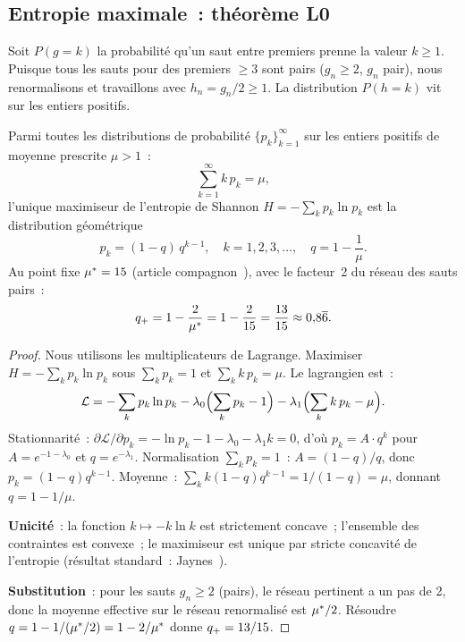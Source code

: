 \documentclass[12pt,a4paper]{article}
\begin{document}
\subsection{Entropie maximale~: théorème L0}
\label{sec:L0}

\begin{definition}
Soit $P(g = k)$ la probabilité qu'un saut entre premiers prenne la
valeur $k \geq 1$. Puisque tous les sauts pour des premiers $\geq 3$
sont pairs ($g_n \geq 2$, $g_n$ pair), nous renormalisons et
travaillons avec $h_n = g_n/2 \geq 1$. La distribution $P(h = k)$ vit
sur les entiers positifs.
\end{definition}

\mTHM
\begin{theoreme}
\label{thm:L0}
Parmi toutes les distributions de probabilité $\{p_k\}_{k=1}^\infty$
sur les entiers positifs de moyenne prescrite $\mu > 1$~:
\[
  \sum_{k=1}^\infty k\, p_k = \mu,
\]
l'unique maximiseur de l'entropie de Shannon
$H = -\sum_k p_k \ln p_k$ est la distribution géométrique
\begin{equation}
  p_k = (1-q)\, q^{k-1}, \quad k = 1, 2, 3, \ldots,
  \quad q = 1 - \frac{1}{\mu}.
  \label{eq:geometric}
\end{equation}
Au point fixe ${\mu^{*}} = 15$ (article compagnon~\cite{companion_M3}),
avec le facteur~2 du réseau des sauts pairs~:
\begin{equation}
  q_{+} = 1 - \frac{2}{{\mu^{*}}} = 1 - \frac{2}{15} = \frac{13}{15}
         \approx 0{,}8\overline{6}.
  \label{eq:qstat}
\end{equation}

\begin{proof}
Nous utilisons les multiplicateurs de Lagrange. Maximiser
$H = -\sum_k p_k \ln p_k$ sous $\sum_k p_k = 1$ et
$\sum_k k\, p_k = \mu$. Le lagrangien est~:
\[
  \mathcal{L} = -\sum_k p_k \ln p_k
    - \lambda_0 \Bigl(\sum_k p_k - 1\Bigr)
    - \lambda_1 \Bigl(\sum_k k\, p_k - \mu\Bigr).
\]
Stationnarité~: $\partial \mathcal{L}/\partial p_k = -\ln p_k - 1 - \lambda_0 - \lambda_1 k = 0$,
d'où $p_k = A \cdot q^k$ pour $A = e^{-1-\lambda_0}$ et
$q = e^{-\lambda_1}$. Normalisation $\sum_k p_k = 1$~:
$A = (1-q)/q$, donc $p_k = (1-q) q^{k-1}$. Moyenne~:
$\sum_k k(1-q)q^{k-1} = 1/(1-q) = \mu$, donnant $q = 1 - 1/\mu$.

\textbf{Unicité}~: la fonction $k \mapsto -k\ln k$ est strictement
concave~; l'ensemble des contraintes est convexe~; le maximiseur est
unique par stricte concavité de l'entropie (résultat standard~:
Jaynes~\cite{Jaynes1957}).

\textbf{Substitution}~: pour les sauts $g_n \geq 2$ (pairs), le réseau
pertinent a un pas de 2, donc la moyenne effective sur le réseau
renormalisé est ${\mu^{*}}/2$. Résoudre
$q = 1 - 1/({\mu^{*}}/2) = 1 - 2/{\mu^{*}}$ donne $q_{+} = 13/15$.
\end{proof}
\end{theoreme}
\end{document}
